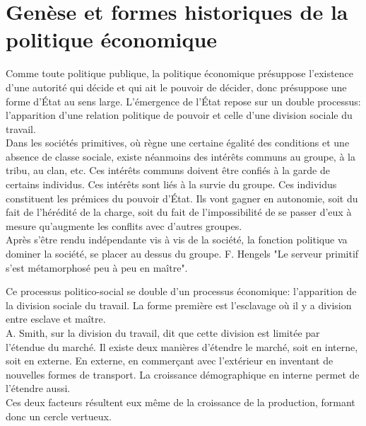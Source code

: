 \documentclass[10pt, a4paper, openany]{book}
\begin{document}
\chapter{Genèse et formes historiques de la politique économique}

Comme toute politique publique, la politique économique présuppose l'existence d'une autorité qui décide et qui ait le pouvoir de décider, donc présuppose une forme d'État au sens large. L'émergence de l'État repose sur un double processus: l'apparition d'une relation politique de pouvoir et celle d'une division sociale du travail. \\
Dans les sociétés primitives, où règne une certaine égalité des conditions et une absence de classe sociale, existe néanmoins des intérêts communs au groupe, à la tribu, au clan, etc. Ces intérêts communs doivent être confiés à la garde de certains individus. Ces intérêts sont liés à la survie du groupe. Ces individus constituent les prémices du pouvoir d'État. Ils vont gagner en autonomie, soit du fait de l'hérédité de la charge, soit du fait de l'impossibilité de se passer d'eux à mesure qu'augmente les conflits avec d'autres groupes. \\
Après s'être rendu indépendante vis à vis de la société, la fonction politique va dominer la société, se placer au dessus du groupe. F. Hengels "Le serveur primitif s'est métamorphosé peu à peu en maître".


Ce processus politico-social se double d'un processus économique: l'apparition de la division sociale du travail. La forme première est l'esclavage où il y a division entre esclave et maître. \\
A. Smith, sur la division du travail, dit que cette division est limitée par l'étendue du marché. Il existe deux manières d'étendre le marché, soit en interne, soit en externe. En externe, en commerçant avec l'extérieur en inventant de nouvelles formes de transport. La croissance démographique en interne permet de l'étendre aussi. \\
Ces deux facteurs résultent eux même de la croissance de la production, formant donc un cercle vertueux.
\end{document}
